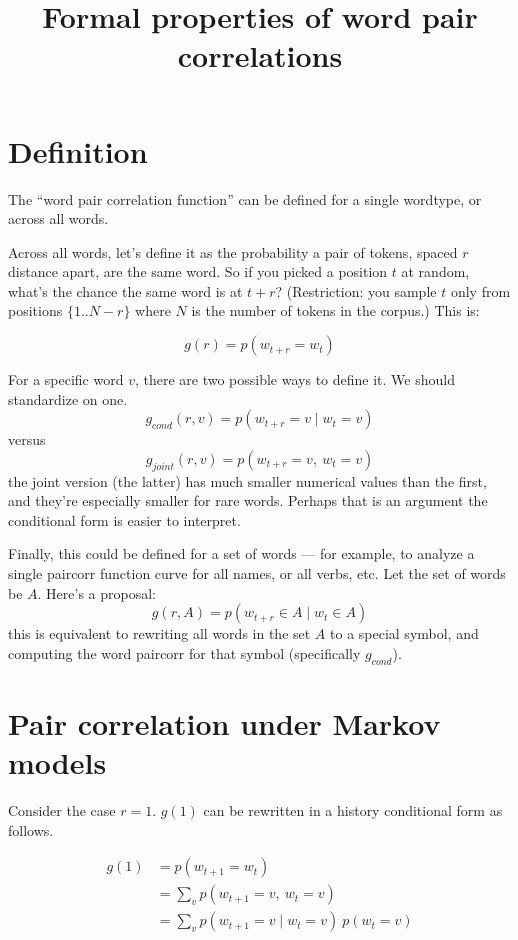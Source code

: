 \documentclass[11pt,letterpaper]{article}
\title{
Formal properties of word pair correlations
}
\author{
}
\theoremstyle{definition}
\begin{document}
\maketitle

\section{Definition}

The ``word pair correlation function'' can be defined for a single wordtype, or across all words.

Across all words, let's define it as the probability a pair of tokens, spaced $r$ distance apart, are the same word.  So if you picked a position $t$ at random, what's the chance the same word is at $t+r$?  (Restriction: you sample $t$ only from positions $\{1..N-r\}$ where $N$ is the number of tokens in the corpus.)  This is:

\[ g(r) = p(w_{t+r} = w_{t}) \]

For a specific word $v$, there are two possible ways to define it.  We should standardize on one.
\[ g_{cond}(r,v) = p(w_{t+r} = v \mid  w_t = v) \]
versus
\[ g_{joint}(r,v) = p(w_{t+r} = v,\ w_t = v) \]
the joint version (the latter) has much smaller numerical values than the first, and they're especially smaller for rare words.  Perhaps that is an argument the conditional form is easier to interpret.

Finally, this could be defined for a set of words --- for example, to analyze a single paircorr function curve for all names, or all verbs, etc.
Let the set of words be $A$.  Here's a proposal:
\[ g(r,A) = p(w_{t+r} \in A \mid w_t \in A) \]
this is equivalent to rewriting all words in the set $A$ to a special symbol, and computing the word paircorr for that symbol (specifically $g_{cond}$).


\section{Pair correlation under Markov models}

Consider the case $r=1$.  $g(1)$ can be rewritten in a history conditional form as follows.

\begin{align}
g(1) &= p(w_{t+1}=w_{t}) \\
&= \sum_v p(w_{t+1}=v,\ w_{t}=v)  \label{e:introduce-v} \\
&= \sum_v p(w_{t+1}=v \mid w_t=v)\ p(w_t=v) \label{e:condprob}
\end{align}
\end{document}
